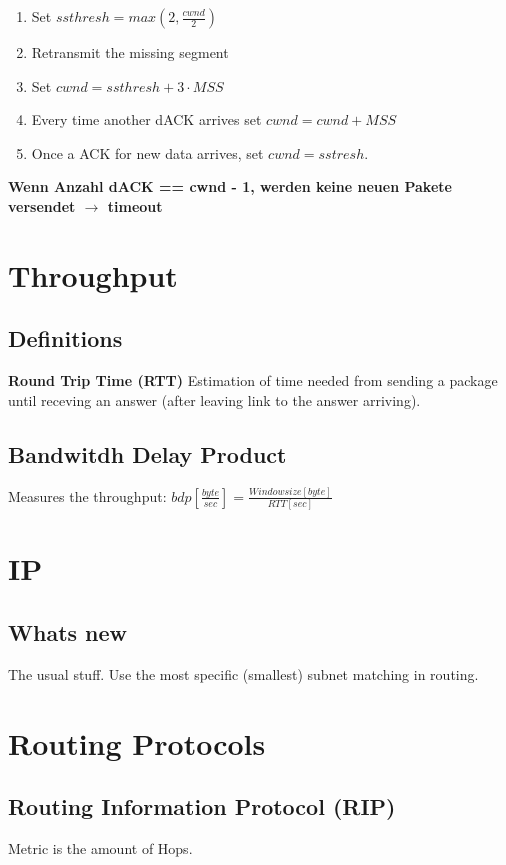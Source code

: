 \documentclass{article}
\begin{document}
\begin{enumerate}
     \item Set $ssthresh = max(2, \frac{cwnd}{2})$
     \item Retransmit the missing segment
     \item Set $cwnd = ssthresh + 3 \cdot MSS$
     \item Every time another dACK arrives set $cwnd = cwnd + MSS$
     \item Once a ACK for new data arrives, set $cwnd = sstresh$.
\end{enumerate}

\textbf{Wenn Anzahl dACK == cwnd - 1, werden keine neuen Pakete versendet $ \rightarrow $ timeout}

\section{Throughput}
\subsection{Definitions}

\textbf{Round Trip Time (RTT)}
Estimation of time needed from sending a package until receving an answer (after leaving link to the answer arriving).

\subsection{Bandwitdh Delay Product}
Measures the throughput: $bdp [\frac{byte}{sec}] = \frac{Windowsize [byte]}{RTT [sec]}$

\section{IP}
\subsection{Whats new}
The usual stuff. Use the most specific (smallest) subnet matching in routing.

\section{Routing Protocols}
\subsection{Routing Information Protocol (RIP)}
Metric is the amount of Hops.
\end{document}
